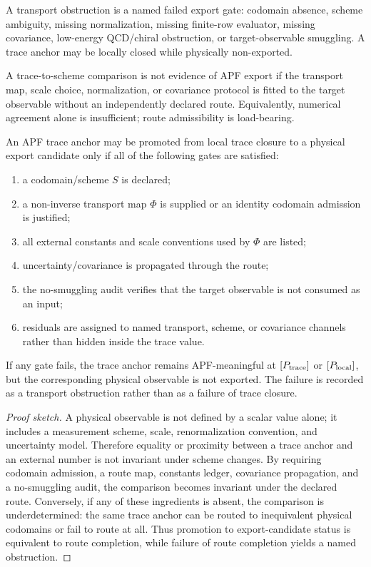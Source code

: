 \begin{definition}
A transport obstruction is a named failed export gate: codomain absence, scheme ambiguity, missing normalization, missing finite-row evaluator, missing covariance, low-energy QCD/chiral obstruction, or target-observable smuggling.  A trace anchor may be locally closed while physically non-exported.
\end{definition}

\begin{lemma}
A trace-to-scheme comparison is not evidence of APF export if the transport map, scale choice, normalization, or covariance protocol is fitted to the target observable without an independently declared route.  Equivalently, numerical agreement alone is insufficient; route admissibility is load-bearing.
\end{lemma}

\begin{theorem}
\label{thm:trace-to-scheme-export}
An APF trace anchor may be promoted from local trace closure to a physical export candidate only if all of the following gates are satisfied:
\begin{enumerate}
\item a codomain/scheme $S$ is declared;
\item a non-inverse transport map $\Phi$ is supplied or an identity codomain admission is justified;
\item all external constants and scale conventions used by $\Phi$ are listed;
\item uncertainty/covariance is propagated through the route;
\item the no-smuggling audit verifies that the target observable is not consumed as an input;
\item residuals are assigned to named transport, scheme, or covariance channels rather than hidden inside the trace value.
\end{enumerate}
If any gate fails, the trace anchor remains APF-meaningful at $[P_{\rm trace}]$ or $[P_{\rm local}]$, but the corresponding physical observable is not exported.  The failure is recorded as a transport obstruction rather than as a failure of trace closure.
\end{theorem}

\begin{proof}[Proof sketch]
A physical observable is not defined by a scalar value alone; it includes a measurement scheme, scale, renormalization convention, and uncertainty model.  Therefore equality or proximity between a trace anchor and an external number is not invariant under scheme changes.  By requiring codomain admission, a route map, constants ledger, covariance propagation, and a no-smuggling audit, the comparison becomes invariant under the declared route.  Conversely, if any of these ingredients is absent, the comparison is underdetermined: the same trace anchor can be routed to inequivalent physical codomains or fail to route at all.  Thus promotion to export-candidate status is equivalent to route completion, while failure of route completion yields a named obstruction.
\end{proof}

